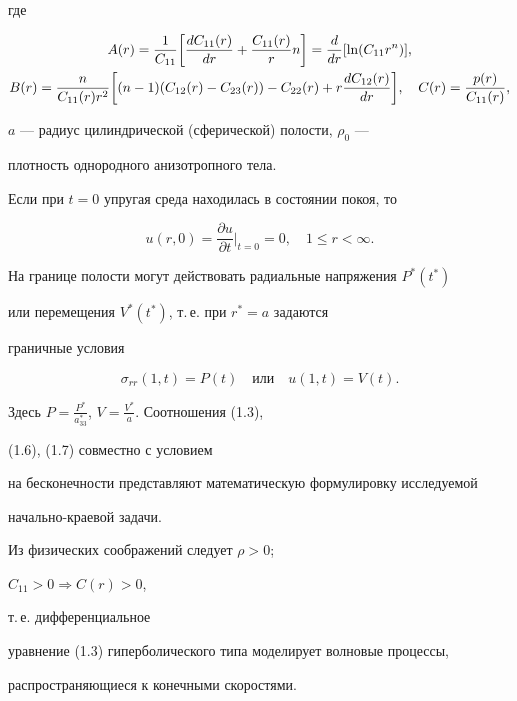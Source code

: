 где 


\begin{gather} 


A(r)=\frac{1}{C_{11}}\biggl[\frac{d C_{11}(r)}{dr}+ 


\frac{C_{11}(r)}{r}n \biggr]=\frac{d}{dr}[\ln(C_{11}r^n)],\\ 


B(r)=\frac{n}{C_{11}(r)r^2}\biggl[(n-1)(C_{12}(r)-C_{23}(r))- 


C_{22}(r)+r\frac{d C_{12}(r)}{dr}\biggr],\quad 


C(r)=\frac{p(r)}{C_{11}(r)},\notag


\end{gather} 


$a$ --- радиус цилиндрической (сферической) полости, $\rho_0$ --- 


плотность однородного анизотропного тела. 


 


Если при $t=0$ упругая среда находилась в состоянии покоя, то 


\begin{equation} 


u(r,0)=\frac{\partial u}{\partial t}\Big|_{t=0}=0,\quad 


1\le r<\infty. 


\end{equation} 


 


На границе полости могут действовать радиальные напряжения $P^*(t^*)$ 


или перемещения $V^*(t^*)$, т.\,е. при $r^*=a$ задаются 


граничные условия 


\begin{equation} 


\sigma_{rr}(1,t)=P(t)\quad\text{или}\quad u(1,t)=V(t). 


\end{equation} 


Здесь $P=\frac{P^*}{a^*_{33}}$, $V=\frac{V^*}{a}$. Соотношения (1.3), 


(1.6), (1.7) совместно с условием 


на бесконечности представляют математическую формулировку исследуемой 


начально-краевой задачи. 


 


\begin{note} 


Из физических соображений следует $\rho>0$;  


$C_{11}>0\Longrightarrow C(r)>0$, 


т.\,е. дифференциальное 


уравнение (1.3) гиперболического типа моделирует волновые процессы, 


распространяющиеся к конечными скоростями. 


\end{note} 


